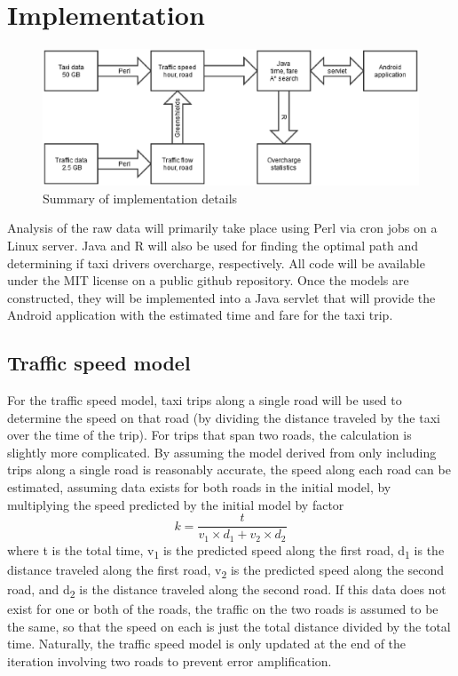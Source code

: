 \documentclass{sig-alternate}
\begin{document}
\section{Implementation}
\begin{figure}
\centering
\includegraphics[scale=.60]{traffic.eps}
\caption{Summary of implementation details}
\end{figure}
Analysis of the raw data will primarily take place using Perl via cron jobs on a Linux server. Java and R will also be used for finding the optimal path and determining if taxi drivers overcharge, respectively.  All code will be available under the MIT license on a public github repository\cite{git}. Once the models are constructed, they will be implemented into a Java servlet that will provide the Android application with the estimated time and fare for the taxi trip.
\subsection{Traffic speed model}
For the traffic speed model, taxi trips along a single road will be used to determine the speed on that road (by dividing the distance traveled by the taxi over the time of the trip). For trips that span two roads, the calculation is slightly more complicated. By assuming the model derived from only including trips along a single road is reasonably accurate, the speed along each road can be estimated, assuming data exists for both roads in the initial model, by multiplying the speed predicted by the initial model by factor
\begin{displaymath}k=\frac{t}{v_{1}\times d_{1}+v_{2}\times d_{2}}\end{displaymath}
where t is the total time, v\textsubscript{1} is the predicted speed along the first road, d\textsubscript{1} is the distance traveled along the first road, v\textsubscript{2} is the predicted speed along the second road, and d\textsubscript{2} is the distance traveled along the second road. If this data does not exist for one or both of the roads, the traffic on the two roads is assumed to be the same, so that the speed on each is just the total distance divided by the total time. Naturally, the traffic speed model is only updated at the end of the iteration involving two roads to prevent error amplification.
\end{document}
